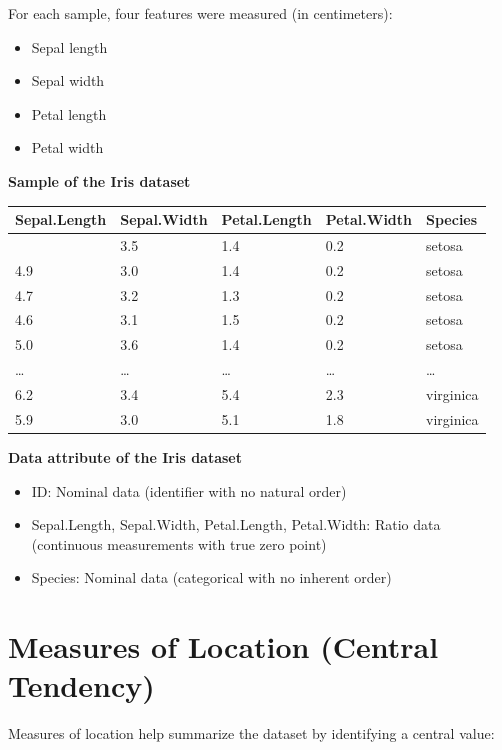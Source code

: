 \documentclass[
]{book}
\newcounter{none} %
\providecommand{\tightlist}{%
  \setlength{\itemsep}{0pt}\setlength{\parskip}{0pt}}
\begin{document}
For each sample, four features were measured (in centimeters):

\begin{itemize}
\tightlist
\item
  Sepal length
\item
  Sepal width
\item
  Petal length
\item
  Petal width
\end{itemize}

\textbf{Sample of the Iris dataset}

{\def\LTcaptype{none} %
\begin{longtable}[]{@{}lllll@{}}
\toprule\noalign{}
Sepal.Length & Sepal.Width & Petal.Length & Petal.Width & Species \\
\midrule\noalign{}
\endhead
\bottomrule\noalign{}
\endlastfoot
5.1 & 3.5 & 1.4 & 0.2 & setosa \\
4.9 & 3.0 & 1.4 & 0.2 & setosa \\
4.7 & 3.2 & 1.3 & 0.2 & setosa \\
4.6 & 3.1 & 1.5 & 0.2 & setosa \\
5.0 & 3.6 & 1.4 & 0.2 & setosa \\
\ldots{} & \ldots{} & \ldots{} & \ldots{} & \ldots{} \\
6.2 & 3.4 & 5.4 & 2.3 & virginica \\
5.9 & 3.0 & 5.1 & 1.8 & virginica \\
\end{longtable}
}

\textbf{Data attribute of the Iris dataset}

\begin{itemize}
\tightlist
\item
  ID: Nominal data (identifier with no natural order)
\item
  Sepal.Length, Sepal.Width, Petal.Length, Petal.Width: Ratio data (continuous measurements with true zero point)
\item
  Species: Nominal data (categorical with no inherent order)
\end{itemize}

\section{Measures of Location (Central Tendency)}\label{central-tendency}

Measures of location help summarize the dataset by identifying a central value:
\end{document}
